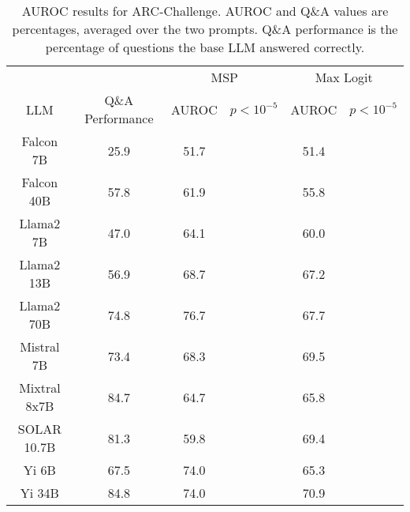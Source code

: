 \begin{table*}
\centering
\begin{tabular}{c|c|c|c|c|c}
& & \multicolumn{2}{c|}{MSP} & \multicolumn{2}{c}{Max Logit} \\ 
LLM & Q\&A Performance & AUROC & $p < 10^{-5}$ & AUROC & $p < 10^{-5}$\\ \hline
Falcon 7B & 25.9 & 51.7 &  & 51.4 & \\
Falcon 40B & 57.8 & 61.9 &  & 55.8 & \\
Llama2 7B & 47.0 & 64.1 &  & 60.0 & \\
Llama2 13B & 56.9 & 68.7 &  & 67.2 & \\
Llama2 70B & 74.8 & 76.7 &  & 67.7 & \\
Mistral 7B & 73.4 & 68.3 &  & 69.5 & \\
Mixtral 8x7B & 84.7 & 64.7 &  & 65.8 & \\
SOLAR 10.7B & 81.3 & 59.8 &  & 69.4 & \\
Yi 6B & 67.5 & 74.0 &  & 65.3 & \\
Yi 34B & 84.8 & 74.0 &  & 70.9 & \\
\hline
\end{tabular}
\caption{AUROC results for ARC-Challenge. AUROC and Q\&A values are percentages, averaged over the two prompts. Q\&A performance is the percentage of questions the base LLM answered correctly.}
\label{tab:arc_auroc}
\end{table*}
